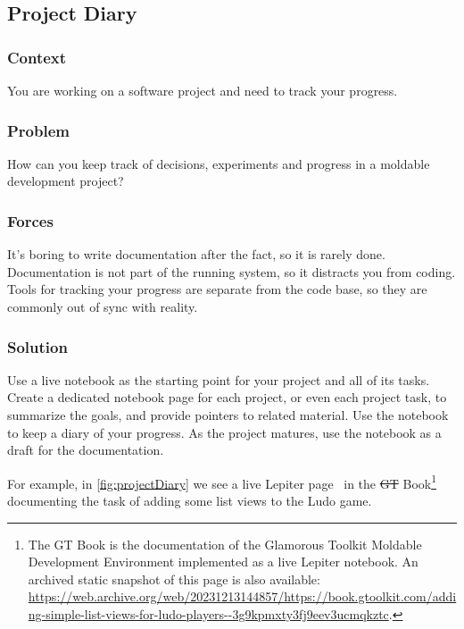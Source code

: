 \documentclass[sigconf]{acmart}
\newcommand{\GT}{\st{GT}\xspace} %
\begin{document}
\subsection*{Project Diary}\label{pat:projectDiary}

\subsubsection*{Context}
You are working on a software project and need to track your progress.

\subsubsection*{Problem}
How can you keep track of decisions, experiments and progress in a moldable development project?

\subsubsection*{Forces}
It's boring to write documentation after the fact, so it is rarely done.
Documentation is not part of the running system, so it distracts you from coding.
Tools for tracking your progress are separate from the code base, so they are commonly out of sync with reality.

\subsubsection*{Solution}
Use a live notebook as the starting point for your project and all of its tasks.
Create a dedicated notebook page for each project, or even each project task, to summarize the goals, and provide pointers to related material.
Use the notebook to keep a diary of your progress.
As the project matures, use the notebook as a draft for the documentation.

For example, in \autoref{fig:projectDiary} we see a live Lepiter page~\cite{Girb21a} in the \GT Book\footnote{The GT Book is the documentation of the Glamorous Toolkit Moldable Development Environment implemented as a live Lepiter notebook. An archived static snapshot of this page is also available: \url{https://web.archive.org/web/20231213144857/https://book.gtoolkit.com/adding-simple-list-views-for-ludo-players--3g9kpmxty3fj9eev3ucmqkztc}.} documenting the task of adding some list views to the Ludo game.
\end{document}
